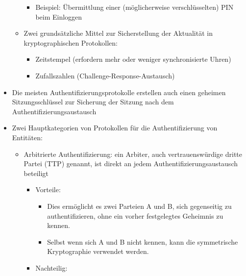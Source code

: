 \documentclass[a4paper]{article}
\begin{document}
\begin{multicols}{3}
\begin{itemize}
\begin{itemize}
                        \begin{itemize}
                            \item
                                  Beispiel: Übermittlung einer (möglicherweise verschlüsselten) PIN
                                  beim Einloggen
                        \end{itemize}
                  \item
                        Zwei grundsätzliche Mittel zur Sicherstellung der Aktualität in
                        kryptographischen Protokollen:

                        \begin{itemize}
                            \item
                                  Zeitstempel (erfordern mehr oder weniger synchronisierte Uhren)
                            \item
                                  Zufallszahlen (Challenge-Response-Austausch)
                        \end{itemize}
              \end{itemize}
        \item
              Die meisten Authentifizierungsprotokolle erstellen auch einen geheimen
              Sitzungsschlüssel zur Sicherung der Sitzung nach dem
              Authentifizierungsaustausch
        \item
              Zwei Hauptkategorien von Protokollen für die Authentifizierung von
              Entitäten:

              \begin{itemize}
                  \item
                        Arbitrierte Authentifizierung: ein Arbiter, auch vertrauenswürdige
                        dritte Partei (TTP) genannt, ist direkt an jedem
                        Authentifizierungsaustausch beteiligt

                        \begin{itemize}
                            \item
                                  Vorteile:

                                  \begin{itemize}
                                      \item
                                            Dies ermöglicht es zwei Parteien A und B, sich gegenseitig zu
                                            authentifizieren, ohne ein vorher festgelegtes Geheimnis zu
                                            kennen.
                                      \item
                                            Selbst wenn sich A und B nicht kennen, kann die symmetrische
                                            Kryptographie verwendet werden.
                                  \end{itemize}
                            \item
                                  Nachteilig:


\end{itemize}
\end{itemize}
\end{itemize}
\end{multicols}
\end{document}
